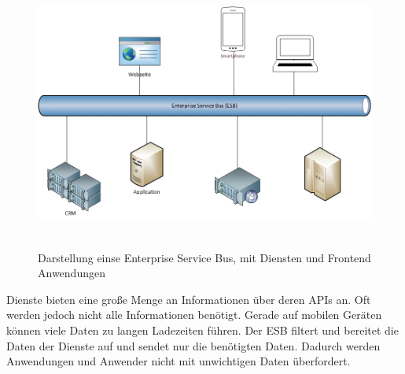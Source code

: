 \begin{figure}[htb]
    \centering 
    \includegraphics[width=\linewidth]{content/images/ESB}\
    \caption[ESB]{Darstellung einse Enterprise Service Bus, mit Diensten und Frontend Anwendungen}
    \label{fig:esb}  
\end{figure}
\newpage
Dienste bieten eine große Menge an Informationen über deren APIs an. Oft werden jedoch nicht alle Informationen benötigt. Gerade auf mobilen Geräten können viele Daten zu langen Ladezeiten führen. Der ESB filtert und bereitet die Daten der Dienste auf und sendet nur die benötigten Daten. Dadurch werden Anwendungen und Anwender nicht mit unwichtigen Daten überfordert.